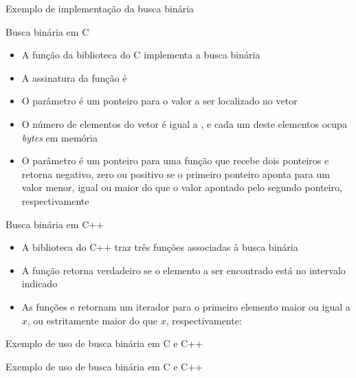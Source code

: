 \begin{frame}[fragile]{Exemplo de implementação da busca binária}
\end{frame}

\begin{frame}[fragile]{Busca binária em C}

    \begin{itemize}
		\item A função  da biblioteca  do C implementa a busca 
        binária

        \item A assinatura da função  é

        \item O parâmetro  é um ponteiro para o valor a ser localizado no
            vetor 

        \item O número de elementos do vetor  é igual a , e 
            cada um deste elementos ocupa  \textit{bytes} em memória

        \item O parâmetro  é um ponteiro para uma função que recebe dois
            ponteiros e retorna negativo, zero ou positivo se o primeiro ponteiro aponta para
            um valor menor, igual ou maior do que o valor apontado pelo segundo ponteiro,
            respectivamente
    \end{itemize}

\end{frame}

\begin{frame}[fragile]{Busca binária em C++}

    \begin{itemize}
        \item A biblioteca  do C++ traz três funções associadas à busca
            binária

        \item A função  retorna verdadeiro se o elemento a ser
        encontrado está no intervalo indicado

        \item As funções  e  retornam um iterador
        para o primeiro elemento maior ou igual a $x$, ou estritamente maior do que $x$, 
        respectivamente:

    \end{itemize}

\end{frame}
\begin{frame}[fragile]{Exemplo de uso de busca binária em C e C++}
\end{frame}

\begin{frame}[fragile]{Exemplo de uso de busca binária em C e C++}
\end{frame}
